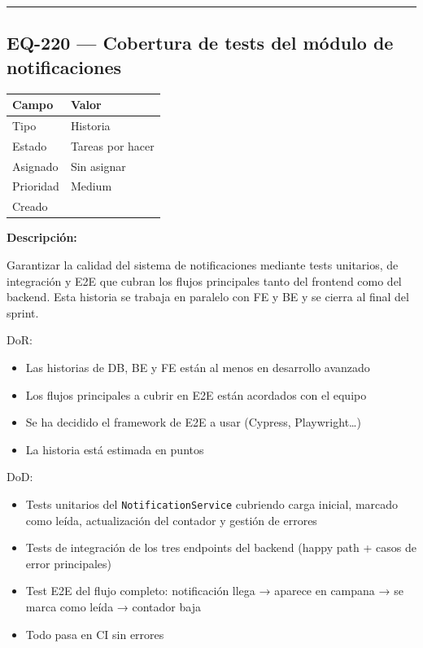 \documentclass[
  spanish,
  11pt,
]{report}
\newcounter{none} %
\providecommand{\tightlist}{%
  \setlength{\itemsep}{0pt}\setlength{\parskip}{0pt}}
\begin{document}
\begin{center}\rule{0.5\linewidth}{0.5pt}\end{center}

\subsection{EQ-220 --- Cobertura de tests del módulo de
notificaciones}\label{eq-220-cobertura-de-tests-del-muxf3dulo-de-notificaciones}

{\def\LTcaptype{none} %
\begin{longtable}[]{@{}ll@{}}
\toprule\noalign{}
Campo & Valor \\
\midrule\noalign{}
\endhead
\bottomrule\noalign{}
\endlastfoot
Tipo & Historia \\
Estado & Tareas por hacer \\
Asignado & Sin asignar \\
Prioridad & Medium \\
Creado & \\
\end{longtable}
}

\textbf{Descripción:}

Garantizar la calidad del sistema de notificaciones mediante tests
unitarios, de integración y E2E que cubran los flujos principales tanto
del frontend como del backend. Esta historia se trabaja en paralelo con
FE y BE y se cierra al final del sprint.

DoR:

\begin{itemize}
\tightlist
\item
  Las historias de DB, BE y FE están al menos en desarrollo avanzado
\item
  Los flujos principales a cubrir en E2E están acordados con el equipo
\item
  Se ha decidido el framework de E2E a usar (Cypress, Playwright\ldots)
\item
  La historia está estimada en puntos
\end{itemize}

DoD:

\begin{itemize}
\tightlist
\item
  Tests unitarios del \texttt{NotificationService} cubriendo carga
  inicial, marcado como leída, actualización del contador y gestión de
  errores
\item
  Tests de integración de los tres endpoints del backend (happy path +
  casos de error principales)
\item
  Test E2E del flujo completo: notificación llega → aparece en campana →
  se marca como leída → contador baja
\item
  Todo pasa en CI sin errores
\end{itemize}
\end{document}
